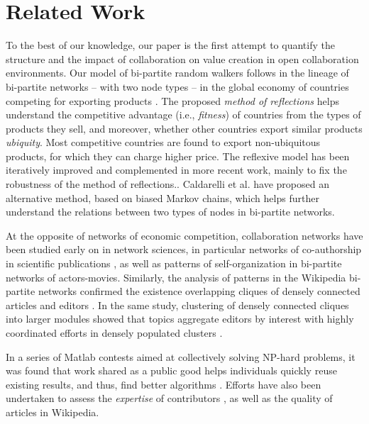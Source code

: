 \section{Related Work}
To the best of our knowledge, our paper is the first attempt to quantify the structure and the impact of collaboration on value creation in open collaboration environments. Our model of {bi-partite random walkers} follows in the lineage of bi-partite networks -- with two node types -- in the global economy of countries competing for exporting products \cite{hidalgo2007,hidalgo2009}. The proposed {\it method of reflections} helps understand the competitive advantage (i.e., {\it fitness}) of countries from the types of products they sell, and moreover, whether other countries export similar products {\it ubiquity}. Most competitive countries are found to export non-ubiquitous products, for which they can charge higher price. The reflexive model has been iteratively improved and complemented in more recent work, mainly to fix the robustness of the method of reflections.\cite{tacchella2012new, cristelli2012competitors, tacchella2013economic, cristelli2013measuring}. Caldarelli et al. \cite{caldarelli2012network} have proposed an alternative method, based on biased Markov chains, which helps further understand the relations between two types of nodes in bi-partite networks. 

At the opposite of networks of economic competition, collaboration networks have been studied early on in network sciences, in particular networks of co-authorship in scientific publications \cite{newman2001}, as well as patterns of self-organization in bi-partite networks of actors-movies\cite{ramasco2004self}. Similarly, the analysis of patterns in the Wikipedia bi-partite networks confirmed the existence overlapping cliques of densely connected articles and editors  \cite{jesus2009}. In the same study, clustering of densely connected cliques into larger modules \cite{guimera2007module} showed that topics aggregate editors by interest with highly coordinated efforts in densely populated clusters \cite{jesus2009}.

In a series of Matlab contests aimed at collectively solving NP-hard problems, it was found that work shared as a public good helps individuals quickly reuse existing results, and thus, find better algorithms \cite{gulley2010}. Efforts have also been undertaken to assess the {\it expertise} of contributors \cite{geiger2013}, as well as the quality of articles \cite{wang2013tell} in Wikipedia.